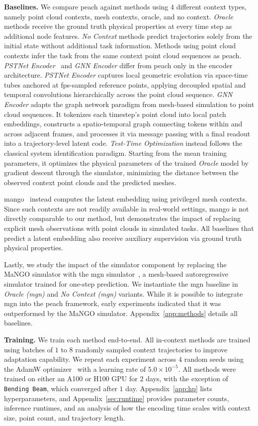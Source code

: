 \textbf{Baselines.}
We compare \gls{peach} against methods using $4$ different context types, namely point cloud contexts, mesh contexts, oracle, and no context.
\textit{Oracle} methods receive the ground truth physical properties at every time step as additional node features.
\textit{No Context} methods predict trajectories solely from the initial state without additional task information.
Methods using point cloud contexts infer the task from the same context point cloud sequences as \gls{peach}.
\textit{PSTNet Encoder}~\citep{fan2021pstnet} and \textit{GNN Encoder} differ from \gls{peach} only in the encoder architecture.
\textit{PSTNet Encoder} captures local geometric evolution via space-time tubes anchored at \gls{fps}-sampled reference points, applying decoupled spatial and temporal convolutions hierarchically across the point cloud sequence.
\textit{GNN Encoder} adapts the graph network paradigm from mesh-based simulation to point cloud sequences.
It tokenizes each timestep's point cloud into local patch embeddings, constructs a spatio-temporal graph connecting tokens within and across adjacent frames, and processes it via message passing with a final readout into a trajectory-level latent code.
\textit{Test-Time Optimization} instead follows the classical system identification paradigm.
Starting from the mean training parameters, it optimizes the physical parameters of the trained \textit{Oracle} model by gradient descent through the simulator, minimizing the distance between the observed context point clouds and the predicted meshes.

\gls{mango}~\citep{dahlinger2025mango} instead computes the latent embedding using privileged mesh contexts.
Since such contexts are not readily available in real-world settings, \gls{mango} is not directly comparable to our method, but demonstrates the impact of replacing explicit mesh observations with point clouds in simulated tasks.
All baselines that predict a latent embedding also receive auxiliary supervision via ground truth physical properties.

Lastly, we study the impact of the simulator component by replacing the MaNGO simulator with the \gls{mgn} simulator~\citep{pfaff2020learning}, a mesh-based autoregressive simulator trained for one-step prediction.
We instantiate the \gls{mgn} baseline in \textit{Oracle (\gls{mgn})} and \textit{No Context (\gls{mgn})} variants.
While it is possible to integrate \gls{mgn} into the \gls{peach} framework, early experiments indicated that it was outperformed by the MaNGO simulator.
Appendix~\ref{app:methods} details all baselines.

\textbf{Training.}
We train each method end-to-end.
All in-context methods are trained using batches of $1$ to $8$ randomly sampled context trajectories to improve adaptation capability.
We repeat each experiment across $4$ random seeds using the AdamW optimizer~\citep{adamw} with a learning rate of $5.0{\times}10^{-5}$.
All methods were trained on either an A100 or H100 GPU for $2$ days, with the exception of \texttt{Bending Beam}, which converged after $1$ day.
Appendix~\ref{app:hp} lists hyperparameters, and Appendix~\ref{sec:runtime} provides parameter counts, inference runtimes, and an analysis of how the encoding time scales with context size, point count, and trajectory length.
